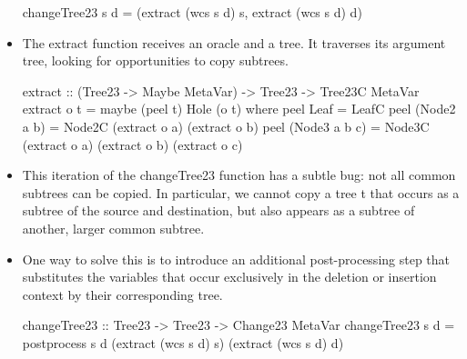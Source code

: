 \begin{itemize}
\begin{haskell}
        changeTree23 s d = (extract (wcs s d) s, extract (wcs s d) d)
    \end{haskell}
    \item The extract function receives an oracle and a tree. It traverses its argument tree, looking for opportunities to copy subtrees.
    \begin{haskell}
        extract :: (Tree23 -> Maybe MetaVar) -> Tree23 -> Tree23C MetaVar
        extract o t = maybe (peel t) Hole (o t)
            where peel Leaf = LeafC
                  peel (Node2 a b)   
                    = Node2C (extract o a) (extract o b)
                  peel (Node3 a b c) 
                    = Node3C (extract o a) (extract o b) (extract o c)
    \end{haskell}
    \item This iteration of the changeTree23 function has a subtle bug: not all common subtrees can be copied. In particular, we cannot copy a tree t that occurs as a subtree of the source and destination, but also appears as a subtree of another, larger common subtree.
    \item One way to solve this is to introduce an additional post-processing step that substitutes the variables that occur exclusively in the deletion or insertion context by their corresponding tree.
    \begin{haskell}
        changeTree23 :: Tree23 -> Tree23 -> Change23 MetaVar
        changeTree23 s d 
            = postprocess s d (extract (wcs s d) s) (extract (wcs s d) d)
    \end{haskell}
\end{itemize}

